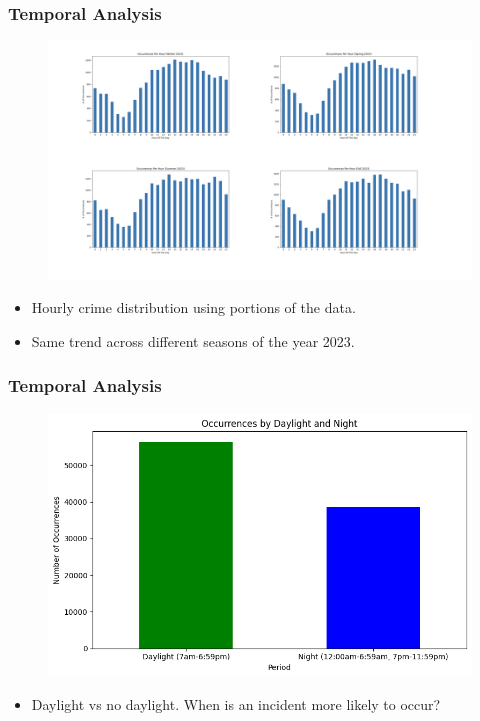 \documentclass{beamer}
\begin{document}
\begin{frame}
    \frametitle{Temporal Analysis}
    \begin{figure}
        \flushleft
        \includegraphics[width=1\linewidth]{Figures/OccurencesPerSeason.001.jpeg}
    \end{figure}
    {\scriptsize %
    \begin{itemize}
        \item  Hourly crime distribution using portions of the data.
        \item  Same trend across different seasons of the year 2023.
    \end{itemize}
    }


\end{frame}


\begin{frame}
    \frametitle{Temporal Analysis}
    \begin{figure}
        \flushleft
        \includegraphics[width=1\linewidth]{Figures/Daylight_and_Night.png}
    \end{figure}
    {\scriptsize %
    \begin{itemize}
        \item  Daylight vs no daylight. When is an incident more likely to occur?
    \end{itemize}
    }
\end{frame}
\end{document}
